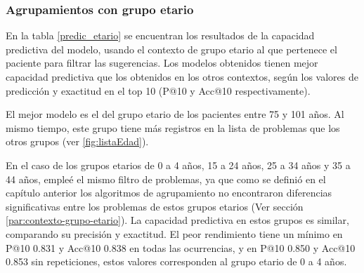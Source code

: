 \subsubsection{Agrupamientos con grupo etario}

En la tabla \ref{predic_etario} se encuentran los resultados de la capacidad predictiva del modelo, usando el contexto de grupo etario al que pertenece el paciente para filtrar las sugerencias. Los modelos obtenidos tienen mejor capacidad predictiva que los obtenidos en los otros contextos, según los valores de predicción y exactitud en el top 10 (P@10 y Acc@10 respectivamente).

El mejor modelo es el del grupo etario de los pacientes entre 75 y 101 años. Al mismo tiempo, este grupo tiene más registros en la lista de problemas que los otros grupos (ver \ref{fig:listaEdad}).

En el caso de los grupos etarios de 0 a 4 años, 15 a 24 años, 25 a 34 años y 35 a 44 años, empleé el mismo filtro de problemas, ya que como se definió en el capítulo anterior los algoritmos de agrupamiento no encontraron diferencias significativas entre los problemas de estos grupos etarios (Ver sección \ref{par:contexto-grupo-etario}). La capacidad predictiva en estos grupos es similar, comparando su precisión y exactitud. El peor rendimiento tiene un mínimo en P@10 \num{0.831} y Acc@10 \num{0.838} en todas las ocurrencias, y en P@10 \num{0.850} y Acc@10 \num{0.853} sin repeticiones, estos valores corresponden al grupo etario de 0 a 4 años.


